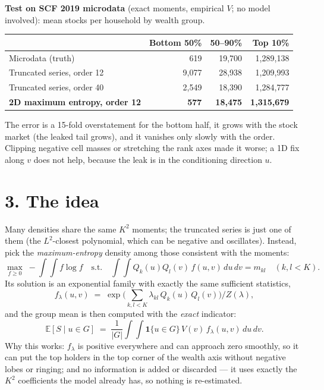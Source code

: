 \documentclass[11pt]{article}
\newcommand{\E}{\mathbb{E}}
\begin{document}
\textbf{Test on SCF 2019 microdata} (exact moments, empirical $V$; no model involved): mean stocks per household by wealth group.
\begin{center}\small
\begin{tabular}{lrrr}\toprule
 & Bottom 50\% & 50--90\% & Top 10\%\\\midrule
Microdata (truth) & 619 & 19{,}700 & 1{,}289{,}138\\
Truncated series, order 12 & 9{,}077 & 28{,}938 & 1{,}209{,}993\\
Truncated series, order 40 & 2{,}549 & 18{,}390 & 1{,}284{,}777\\
\textbf{2D maximum entropy, order 12} & \textbf{577} & \textbf{18{,}475} & \textbf{1{,}315{,}679}\\\bottomrule
\end{tabular}\end{center}
The error is a 15-fold overstatement for the bottom half, it grows with the stock market (the leaked tail grows), and it vanishes only slowly with the order. Clipping negative cell masses or stretching the rank axes made it worse; a 1D fix along $v$ does not help, because the leak is in the conditioning direction $u$.

\section*{3. The idea}
Many densities share the same $K^2$ moments; the truncated series is just one of them (the $L^2$-closest polynomial, which can be negative and oscillates). Instead, pick the \emph{maximum-entropy} density among those consistent with the moments:
\[
\max_{f\ge 0}\; -\!\int\!\!\int f\log f \quad \text{s.t.}\quad \int\!\!\int Q_k(u)Q_l(v)\, f(u,v)\,du\,dv = m_{kl}\quad (k,l<K).
\]
Its solution is an exponential family with exactly the same sufficient statistics,
\[
f_\lambda(u,v) \;=\; \exp\Big(\sum_{k,l<K}\lambda_{kl}\,Q_k(u)\,Q_l(v)\Big)\Big/ Z(\lambda),
\]
and the group mean is then computed with the \emph{exact} indicator:
\[
\E[S\mid u\in G] \;=\; \frac{1}{|G|}\int\!\!\int \mathbf 1\{u\in G\}\,V(v)\,f_\lambda(u,v)\,du\,dv .
\]
Why this works: $f_\lambda$ is positive everywhere and can approach zero smoothly, so it can put the top holders in the top corner of the wealth axis without negative lobes or ringing; and no information is added or discarded --- it uses exactly the $K^2$ coefficients the model already has, so nothing is re-estimated.
\end{document}

